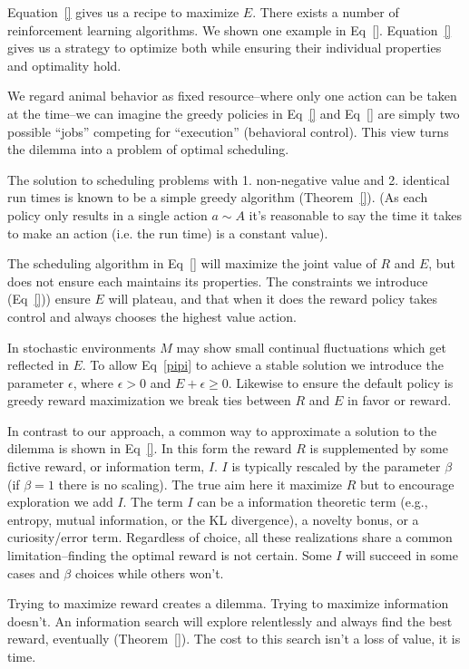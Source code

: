 \documentclass[9pt,twocolumn,twoside]{pnas-new}
\begin{document}
Equation~\ref{} gives us a recipe to maximize $E$. There exists a number of reinforcement learning algorithms. We shown one example in Eq~\ref{}. Equation~\ref{} gives us a strategy to optimize both while ensuring their individual properties and optimality hold. 

We regard animal behavior as fixed resource--where only one action can be taken at the time--we can imagine the greedy policies in Eq~\ref{} and Eq~\ref{} are simply two possible ``jobs'' competing for ``execution'' (behavioral control). This view turns the dilemma into a problem of optimal scheduling. 

The solution to scheduling problems with 1. non-negative value and 2. identical run times is known to be a simple greedy algorithm (Theorem~\ref{}). (As each policy only results in a single action $a \sim A$ it's reasonable to say the time it takes to make an action (i.e. the run time) is a constant value).


The scheduling algorithm in Eq~\ref{} will maximize the joint value of $R$ and $E$, but does not ensure each maintains its properties. The constraints we introduce (Eq~\ref{})) ensure $E$ will plateau, and that when it does the reward policy takes control and always chooses the highest value action. 

In stochastic environments $M$ may show small continual fluctuations which get reflected in $E$. To allow Eq~\ref{pipi} to achieve a stable solution we introduce the parameter $\epsilon$, where $\epsilon > 0$ and $E + \epsilon \geq 0$. Likewise to ensure the default policy is greedy reward maximization we break ties between $R$ and $E$ in favor or reward.

In contrast to our approach, a common way to approximate a solution to the dilemma is shown in Eq~\ref{}. In this form the reward $R$ is supplemented by some fictive reward, or information term, $I$. $I$ is typically rescaled by the parameter $\beta$ (if $\beta = 1$ there is no scaling). The true aim here it maximize $R$ but to encourage exploration we add $I$. The term $I$ can be a information theoretic term (e.g., entropy, mutual information, or the KL divergence), a novelty bonus, or a curiosity/error term. Regardless of choice, all these realizations share a common limitation--finding the optimal reward is not certain. Some $I$ will succeed in some cases and $\beta$ choices while others won't. 

Trying to maximize reward creates a dilemma. Trying to maximize information doesn't. An information search will explore relentlessly and always find the best reward, eventually (Theorem~\ref{}). The cost to this search isn't a loss of value, it is time.  
\end{document}
